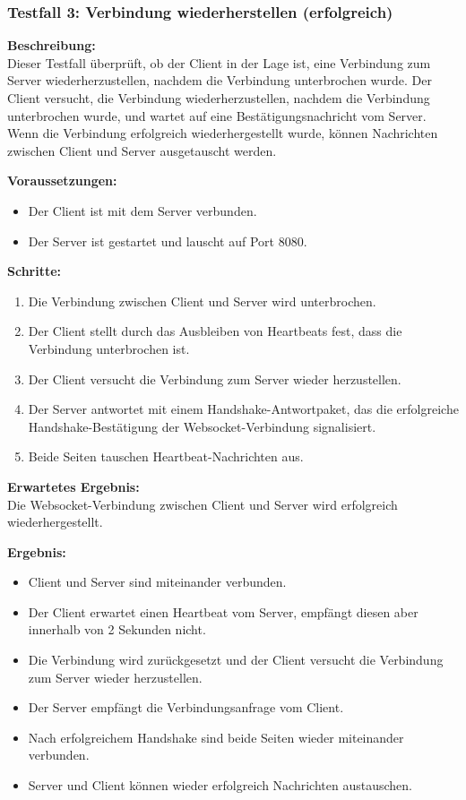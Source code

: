 \documentclass[thesis.tex]{subfiles}
\begin{document}
\pagebreak

\subsubsection*{Testfall 3: Verbindung wiederherstellen (erfolgreich)}

\textbf{Beschreibung:}\\
Dieser Testfall überprüft, ob der Client in der Lage ist, eine Verbindung zum Server wiederherzustellen, nachdem die Verbindung unterbrochen wurde. Der Client versucht, die Verbindung wiederherzustellen, nachdem die Verbindung unterbrochen wurde, und wartet auf eine Bestätigungsnachricht vom Server. Wenn die Verbindung erfolgreich wiederhergestellt wurde, können Nachrichten zwischen Client und Server ausgetauscht werden.

\textbf{Voraussetzungen:}
\begin{itemize}
    \item Der Client ist mit dem Server verbunden.
    \item Der Server ist gestartet und lauscht auf Port 8080.
\end{itemize}

\textbf{Schritte:}
\begin{enumerate}
    \item Die Verbindung zwischen Client und Server wird unterbrochen.
    \item Der Client stellt durch das Ausbleiben von Heartbeats fest, dass die Verbindung unterbrochen ist.
    \item Der Client versucht die Verbindung zum Server wieder herzustellen.
    \item Der Server antwortet mit einem Handshake-Antwortpaket, das die erfolgreiche\\ Handshake-Bestätigung der Websocket-Verbindung signalisiert.
    \item Beide Seiten tauschen Heartbeat-Nachrichten aus.
\end{enumerate}

\textbf{Erwartetes Ergebnis:}\\
Die Websocket-Verbindung zwischen Client und Server wird erfolgreich wiederhergestellt.

\textbf{Ergebnis:}
\begin{itemize}
    \item Client und Server sind miteinander verbunden.
    \item Der Client erwartet einen Heartbeat vom Server, empfängt diesen aber innerhalb von 2 Sekunden nicht.
    \item Die Verbindung wird zurückgesetzt und der Client versucht die Verbindung zum Server wieder herzustellen.
    \item Der Server empfängt die Verbindungsanfrage vom Client.
    \item Nach erfolgreichem Handshake sind beide Seiten wieder miteinander verbunden.
    \item Server und Client können wieder erfolgreich Nachrichten austauschen.
\end{itemize}
\end{document}
